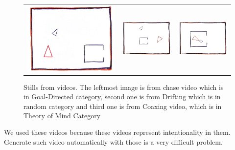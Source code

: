 \documentclass[11pt, twocolumn]{article}
\begin{document}
\begin{figure}[H]
\begin{tabular}{ccc}
\includegraphics[scale=0.09]{chase348.png} &
\includegraphics[scale=0.18]{drift271.png} &
\includegraphics[scale=0.18]{coax88.png}
\end{tabular}    
\label{tab:gt}
\caption{Stills from videos. The leftmost image is from chase video which is in Goal-Directed category, second one is from Drifting which is in random category and third one is from Coaxing video, which is in Theory of Mind Category}
\end{figure}
We used these videos because these videos represent intentionality in them. Generate such video automatically with those is a very difficult problem.
\end{document}
